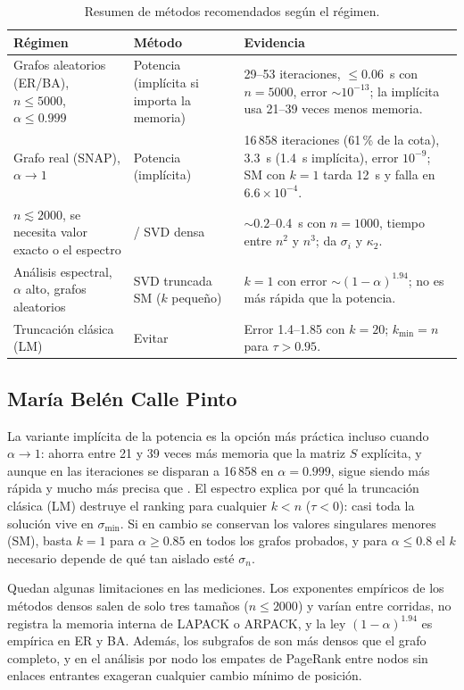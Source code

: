\documentclass[11pt,a4paper]{article}
\newcommand{\code}[1]{\texttt{\detokenize{#1}}}
\begin{document}
\begin{table}[!htbp]
\centering\small\setlength{\tabcolsep}{4pt}
\begin{tabular}{@{}p{3.6cm}p{3.4cm}p{8.2cm}@{}}
\toprule
R\'egimen & M\'etodo & Evidencia\\
\midrule
Grafos aleatorios (ER/BA), $n\le5000$, $\alpha\le0.999$
 & Potencia (impl\'icita si importa la memoria)
 & 29--53 iteraciones, $\le0.06$~s con $n=5000$, error $\sim10^{-13}$; la impl\'icita usa 21--39 veces menos memoria.\\
Grafo real (SNAP), $\alpha\to1$
 & Potencia (impl\'icita)
 & 16\,858 iteraciones (61\,\% de la cota), 3.3~s (1.4~s impl\'icita), error $10^{-9}$; \code{svds} SM con $k=1$ tarda 12~s y falla en $6.6\times10^{-4}$.\\
$n\lesssim2000$, se necesita valor exacto o el espectro
 & \code{pinv} / SVD densa
 & $\sim0.2$--0.4~s con $n=1000$, tiempo entre $n^2$ y $n^3$; da $\sigma_i$ y $\kappa_2$.\\
An\'alisis espectral, $\alpha$ alto, grafos aleatorios
 & SVD truncada SM ($k$ peque\~no)
 & $k=1$ con error $\sim(1-\alpha)^{1.94}$; no es m\'as r\'apida que la potencia.\\
Truncaci\'on cl\'asica (LM)
 & Evitar
 & Error 1.4--1.85 con $k=20$; $k_{\min}=n$ para $\tau>0.95$.\\
\bottomrule
\end{tabular}
\caption{Resumen de m\'etodos recomendados seg\'un el r\'egimen.}
\end{table}

\subsection{Mar\'ia Bel\'en Calle Pinto}
La variante impl\'icita de la potencia es la opci\'on m\'as pr\'actica incluso cuando $\alpha\to 1$: ahorra entre 21 y 39 veces m\'as memoria que la matriz $S$ expl\'icita, y aunque en \code{web-Stanford} las iteraciones se disparan a 16\,858 en $\alpha=0.999$, sigue siendo m\'as r\'apida y mucho m\'as precisa que \code{svds}. El espectro explica por qu\'e la truncaci\'on cl\'asica (LM) destruye el ranking para cualquier $k<n$ ($\tau<0$): casi toda la soluci\'on vive en $\sigma_{\min}$. Si en cambio se conservan los valores singulares menores (SM), basta $k=1$ para $\alpha\ge 0.85$ en todos los grafos probados, y para $\alpha\le 0.8$ el $k$ necesario depende de qu\'e tan aislado est\'e $\sigma_n$.

Quedan algunas limitaciones en las mediciones. Los exponentes emp\'iricos de los m\'etodos densos salen de solo tres tama\~nos ($n\le 2000$) y var\'ian entre corridas, \code{tracemalloc} no registra la memoria interna de LAPACK o ARPACK, y la ley $(1-\alpha)^{1.94}$ es emp\'irica en ER y BA. Adem\'as, los subgrafos de \code{web-Stanford} son m\'as densos que el grafo completo, y en el an\'alisis por nodo los empates de PageRank entre nodos sin enlaces entrantes exageran cualquier cambio m\'inimo de posici\'on.
\end{document}
